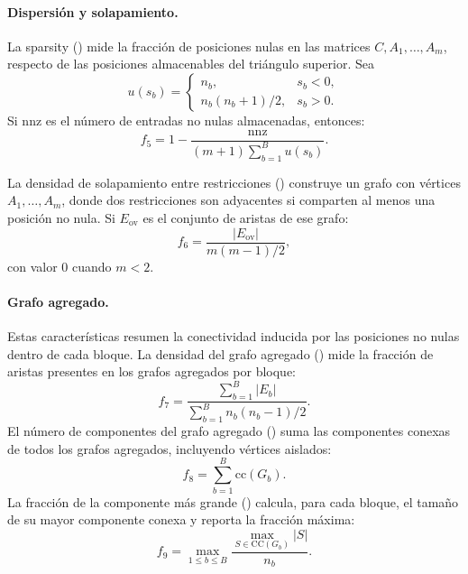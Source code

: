 \paragraph{Dispersión y solapamiento.}
La sparsity () mide la fracción de posiciones nulas en las matrices
$C,A_1,\ldots,A_m$, respecto de las posiciones almacenables del triángulo superior.
Sea
\[
    u(s_b)=
    \begin{cases}
        n_b, & s_b<0,\\
        n_b(n_b+1)/2, & s_b>0.
    \end{cases}
\]
Si $\mathrm{nnz}$ es el número de entradas no nulas almacenadas, entonces:
\[
    f_5 = 1-\frac{\mathrm{nnz}}{(m+1)\sum_{b=1}^{B}u(s_b)}.
\]

La densidad de solapamiento entre restricciones
() construye un grafo con vértices
$A_1,\ldots,A_m$, donde dos restricciones son adyacentes si comparten al menos una
posición no nula.
Si $E_{\mathrm{ov}}$ es el conjunto de aristas de ese grafo:
\[
    f_6 = \frac{|E_{\mathrm{ov}}|}{m(m-1)/2},
\]
con valor $0$ cuando $m<2$.

\paragraph{Grafo agregado.}
Estas características resumen la conectividad inducida por las posiciones no nulas
dentro de cada bloque.
La densidad del grafo agregado () mide la fracción de
aristas presentes en los grafos agregados por bloque:
\[
    f_7 =
    \frac{\sum_{b=1}^{B}|E_b|}
         {\sum_{b=1}^{B} n_b(n_b-1)/2}.
\]
El número de componentes del grafo agregado
() suma las componentes conexas de todos los grafos
agregados, incluyendo vértices aislados:
\[
    f_8 = \sum_{b=1}^{B}\mathrm{cc}(G_b).
\]
La fracción de la componente más grande
() calcula, para cada bloque, el tamaño
de su mayor componente conexa y reporta la fracción máxima:
\[
    f_9 =
    \max_{1\leq b\leq B}
    \frac{\max_{S\in \mathrm{CC}(G_b)} |S|}{n_b}.
\]

